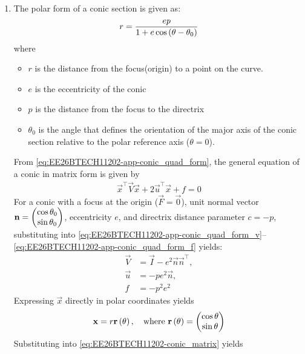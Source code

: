 \begin{enumerate}[label=\thesubsection.\arabic*, ref=\thesubsection.\theenumi]
\begin{align}
\\
= e^2 \left(c^2 + \left(\vec{x}^\top \vec{n}\vec{n}^\top \vec{x}\right) - 2c\vec{n}^\top \vec{x}\right)
\end{align}
which can be expressed as \eqref{eq:EE26BTECH11202-app-conic_quad_form} after simplification.
\item The polar form of a conic section is given as: 
\begin{align}
	r = \frac{ep}{1 + e\cos\left(\theta - \theta_0\right)} \label{eq:EE26BTECH11202-polar_conic}
\end{align}
where
\begin{itemize}
	\item $r$ is the distance from the focus(origin) to a point on the curve.
	\item $e$ is the eccentricity of the conic
	\item $p$ is the distance from the focus to the directrix
	\item $\theta _{0}$ is the angle that defines the orientation of the major axis of the conic section relative to the polar reference axis ($\theta = 0$).
\end{itemize}
\solution
From \eqref{eq:EE26BTECH11202-app-conic_quad_form}, the general equation of a conic in matrix form is given by
\begin{align}
    \vec{x}^{\top}\vec{V}\vec{x} + 2\vec{u}^{\top}\vec{x} + f = 0
    \label{eq:EE26BTECH11202-conic_matrix}
\end{align}
For a conic with a focus at the origin ($\vec{F} = \vec{0}$), unit normal vector $\mathbf{n} = \begin{pmatrix}\cos\theta_0 \\ \sin\theta_0\end{pmatrix}$, eccentricity $e$, and directrix distance parameter $c = -p$, substituting into \eqref{eq:EE26BTECH11202-app-conic_quad_form_v}--\eqref{eq:EE26BTECH11202-app-conic_quad_form_f} yields:
\begin{align}
\vec{V} &= \vec{I} - e^2\vec{n}\vec{n}^{\top}, \label{eq:EE26BTECH11202-V_param} \\
\vec{u} &= -p e^2\vec{n}, \label{eq:EE26BTECH11202-u_param} \\
f &= -p^2 e^2 \label{eq:EE26BTECH11202-f_param}
\end{align}
Expressing $\vec{x}$ directly in polar coordinates yields
\begin{align}
\mathbf{x} = r \mathbf{r}\left(\theta\right), \quad \text{where } \mathbf{r}\left(\theta\right) = \begin{pmatrix}\cos\theta \\ \sin\theta\end{pmatrix}
\end{align}
Substituting into \eqref{eq:EE26BTECH11202-conic_matrix} yields

\end{enumerate}
